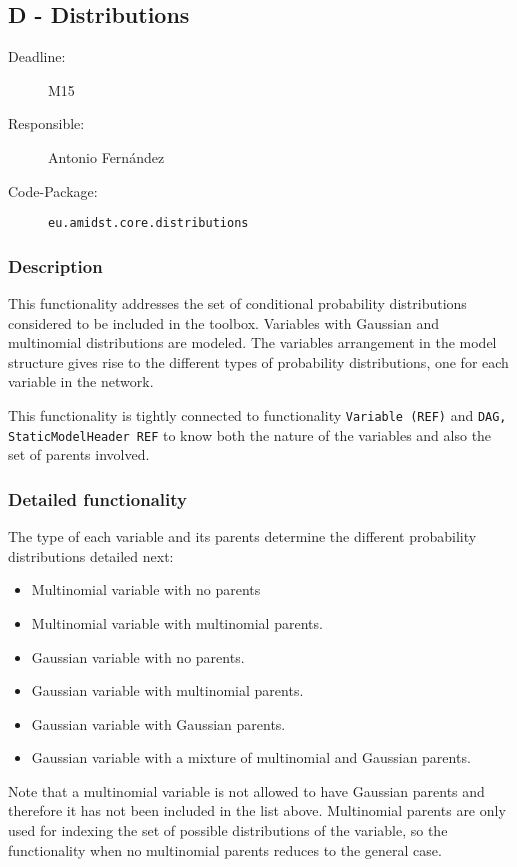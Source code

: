 \subsection{D - Distributions}
\label{Distributions:D}

\begin{description}
\item[Deadline:] M15
\item[Responsible:] Antonio Fern\'andez
\item[Code-Package:] \texttt{eu.amidst.core.distributions}
\end{description}

\subsubsection*{Description}

This functionality addresses the set of conditional probability distributions considered to be included in the toolbox. Variables with Gaussian and multinomial distributions are modeled. The variables arrangement in the model structure gives rise to the different types of probability distributions, one for each variable in the network. 

This functionality is tightly connected to functionality \texttt{Variable (REF)} and \texttt{DAG, StaticModelHeader REF} to know both the nature of the variables and also the set of parents involved.



\subsubsection*{Detailed functionality}

The type of each variable and its parents determine the different probability distributions detailed next:

\begin{itemize}
\item Multinomial variable with no parents
\item Multinomial variable with multinomial parents.
\item Gaussian variable with no parents.
\item Gaussian variable with multinomial parents.
\item Gaussian variable with Gaussian parents. 
\item Gaussian variable with a mixture of multinomial and Gaussian parents. 

\end{itemize}

Note that a multinomial variable is not allowed to have Gaussian parents and therefore it has not been included in the list above.
Multinomial parents are only used for indexing the set of possible distributions of the variable, so the functionality when no multinomial parents reduces to the general case.


